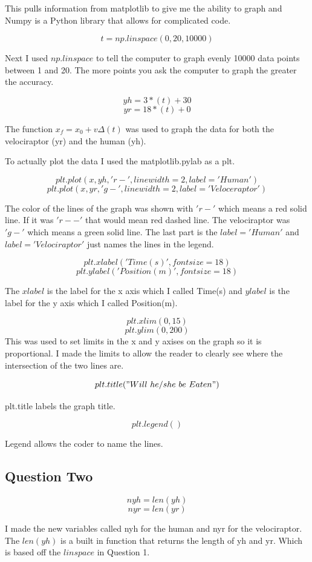 \documentclass[twocolumn]{revtex4}
\begin{document}
This pulls information from matplotlib to give me the ability to graph and Numpy is a Python  library that allows for complicated code.

$$t = np.linspace(0,20,10000)$$

Next I used $np.linspace$ to tell the computer to graph evenly 10000 data points between 1 and 20. The more points you ask the computer to graph the greater the accuracy. 

 
$$yh = 3*(t) + 30$$  
$$yr = 18*(t) + 0$$

The function $x_f = x_0 + v\Delta(t)$ was used to graph the data for both the velociraptor (yr) and the human (yh).

To actually plot the data I used the matplotlib.pylab as a plt. 

$$plt.plot(x,yh,'r-',linewidth=2,label='Human')$$
$$plt.plot(x,yr,'g-',linewidth=2,label='Veloceraptor')$$

The color of the lines of the graph was shown with $'r-'$ which means a red solid line. If it was $'r--'$ that would mean red dashed line. The velociraptor was $'g-'$ which means a green solid line. The last part is the $label =  'Human'$ and $label = 'Velociraptor'$ just names the lines in the legend. 

$$plt.xlabel('Time(s)',fontsize=18)$$
$$plt.ylabel('Position (m)',fontsize=18)$$

The $xlabel$ is the label for the x axis which I called Time(s) and $ylabel$ is the label for the y axis which I called Position(m).

$$plt.xlim(0,15)$$ 
$$plt.ylim(0,200)$$
This was used to set limits in the x and y axises on the graph so it is proportional. I made the limits to allow the reader to clearly see where the intersection of the two lines are. 

$$plt.title ("Will~he/she~ be~ Eaten")$$

plt.title labels the graph title.

$$plt.legend()$$

Legend allows the coder to name the lines.

\subsection{Question Two}

$$nyh = len(yh)$$
$$nyr = len(yr)$$

I made the new variables called nyh for the human and nyr for the velociraptor. The $len(yh)$ is a built in function that returns the length of yh and yr. Which is based off the $linspace$ in Question 1.
\end{document}
